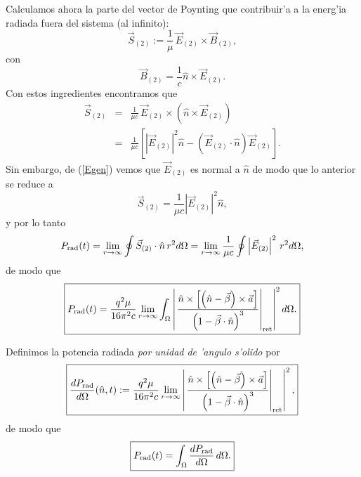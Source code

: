 Calculamos ahora la parte del vector de Poynting que contribuir'a a la energ'ia
radiada fuera del sistema (al infinito):
\begin{equation}
 \vec{S}_{(2)}:=\frac{1}{\mu}\, \vec{E}_{(2)}\times\vec{B}_{(2)},
\end{equation}
con
\begin{equation}
\vec{B}_{(2)}= \frac{1}{c}\hat{n}\times\vec{E}_{(2)}.
\end{equation}
Con estos ingredientes encontramos que
\begin{eqnarray}
 \vec{S}_{(2)}&=&\frac{1}{\mu c}\, \vec{E}_{(2)}\times\left(
\hat{n}\times\vec{E}_{(2)}\right) \\
 &=& \frac{1}{\mu c}\left[ \left|\vec{E}_{(2)}\right|^2 \hat{n}-\left(
\vec{E}_{(2)}\cdot\hat{n}\right)  \vec{E}_{(2)}\right].
\end{eqnarray}
Sin embargo, de (\ref{Egen}) vemos que $\vec{E}_{(2)}$ es normal a $\hat{n}$ de
modo que lo anterior se reduce a
\begin{equation}\label{S2E}
 \boxed{\vec{S}_{(2)}= \frac{1}{\mu c} \left|\vec{E}_{(2)}\right|^2 \hat{n},}
\end{equation}
y por lo tanto
\begin{equation}
P_{\rm rad} (t)=\lim_{r\rightarrow\infty}\oint \vec{S}_{(2)}\cdot\hat{n}\,r^2 d\Omega = \lim_{r\rightarrow\infty}\frac{1}{\mu c}\oint \left|\vec{E}_{(2)}\right|^2\,r^2 d\Omega,
\end{equation}
de modo que
\begin{equation}
 \boxed{P_{\rm rad} (t)=\frac{q^2\mu}{16\pi^2c}\lim_{r\rightarrow\infty}\int_\Omega
\left|\left.\frac{\hat{n}\times\left[ \left( \hat{n}-\vec{\beta}\right)
\times{\vec{a}}\right] }{\left( 1-\vec{\beta}\cdot\hat{n}\right)
^3}\right|_{\rm ret}\right|^2 d\Omega.}
\end{equation}

Definimos la potencia radiada \textit{por unidad de 'angulo s'olido}
por
\begin{equation}
 \boxed{\frac{dP_{\rm rad}}{d\Omega}(\hat{n},t):=\frac{q^2\mu}{16\pi^2c}\lim_{r\rightarrow\infty} \left|\left.
\frac{\hat{n}\times\left[ \left( \hat{n}-\vec{\beta}\right)
\times{\vec{a}}\right] }{\left( 1-\vec{\beta}\cdot\hat{n}\right)
^3}\right|_{\rm ret}\right|^2 ,} \label{dPdO}
\end{equation}
de modo que
\begin{equation}
 \boxed{P_{\rm rad}(t)=\int_\Omega \frac{dP_{\rm rad}}{d\Omega}\,d\Omega.}
\end{equation}


